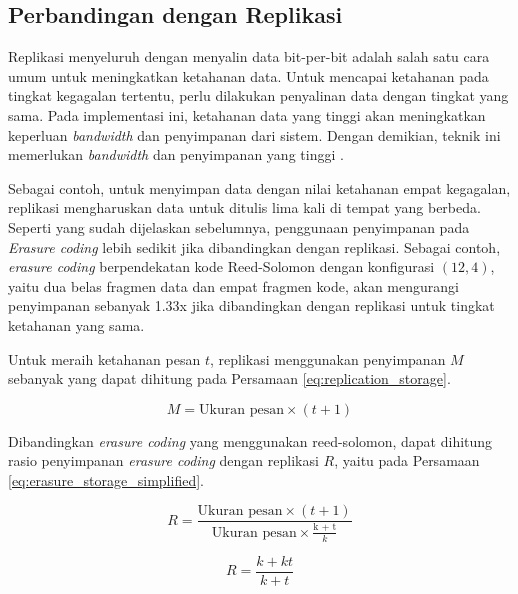 \subsection{Perbandingan dengan Replikasi}

Replikasi menyeluruh dengan menyalin data bit-per-bit adalah salah satu cara umum untuk meningkatkan ketahanan data. Untuk mencapai ketahanan pada tingkat kegagalan tertentu, perlu dilakukan penyalinan data dengan tingkat yang sama. Pada implementasi ini, ketahanan data yang tinggi akan meningkatkan keperluan \textit{bandwidth} dan penyimpanan dari sistem. Dengan demikian, teknik ini memerlukan \textit{bandwidth} dan penyimpanan yang tinggi  \parencite{weatherspoon2002erasure}.

Sebagai contoh, untuk menyimpan data dengan nilai ketahanan empat kegagalan, replikasi mengharuskan data untuk ditulis lima kali di tempat yang berbeda. Seperti yang sudah dijelaskan sebelumnya, penggunaan penyimpanan pada \textit{Erasure coding} lebih sedikit jika dibandingkan dengan replikasi. Sebagai contoh, \textit{erasure coding} berpendekatan kode Reed-Solomon dengan konfigurasi $(12, 4)$, yaitu dua belas fragmen data dan empat fragmen kode, akan mengurangi penyimpanan sebanyak 1.33x jika dibandingkan dengan replikasi untuk tingkat ketahanan yang sama.

Untuk meraih ketahanan pesan $t$, replikasi menggunakan penyimpanan $M$ sebanyak yang dapat dihitung pada Persamaan \ref{eq:replication_storage}.

\begin{equation}
	M = \text{Ukuran pesan} \times (t + 1)
	\label{eq:replication_storage}
\end{equation}

Dibandingkan \textit{erasure coding} yang menggunakan reed-solomon, dapat dihitung rasio penyimpanan \textit{erasure coding} dengan replikasi $R$, yaitu pada Persamaan \ref{eq:erasure_storage_simplified}.

\begin{equation}
	R = \frac{\text{Ukuran pesan} \times (t + 1)}{\text{Ukuran pesan} \times \frac{\text{k + t}}{k}}
	\label{eq:erasure_storage}
\end{equation}

\begin{equation}
	R = \frac{k + kt}{k + t}
	\label{eq:erasure_storage_simplified}
\end{equation}


